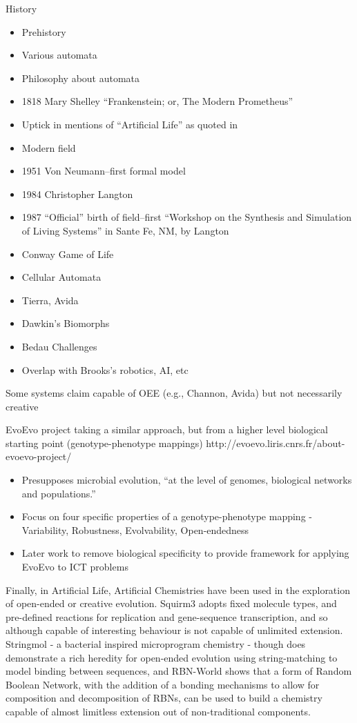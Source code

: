 History

\begin{itemize}
	\item Prehistory
	\item Various automata
	\item
	      Philosophy about automata
	\item
	      1818 Mary Shelley ``Frankenstein; or, The Modern Prometheus''
	\item
	      Uptick in mentions of ``Artificial Life'' as quoted in \autocite{Aguilar2014}
	\item
	      Modern field
	\item
	      1951 Von Neumann--first formal model
	\item
	      1984 Christopher Langton
	\item
	      1987 ``Official'' birth of field--first ``Workshop on the Synthesis
	      and Simulation of Living Systems'' in Sante Fe, NM, by Langton
	\item
	      Conway Game of Life
	\item
	      Cellular Automata
	\item
	      Tierra, Avida
	\item
	      Dawkin's Biomorphs
	\item
	      Bedau Challenges
	\item
	      Overlap with Brooks's robotics, AI, etc
\end{itemize}

Some systems claim capable of OEE (e.g., Channon, Avida) but not necessarily creative

EvoEvo project taking a similar approach, but from a higher level biological starting point (genotype-phenotype mappings)
http://evoevo.liris.cnrs.fr/about-evoevo-project/

\begin{itemize}
	\item Presupposes microbial evolution, ``at the level of genomes, biological networks and populations.''
	\item Focus on four specific properties of a genotype-phenotype mapping - Variability, Robustness, Evolvability, Open-endedness
	\item Later work to remove biological specificity to provide framework for applying EvoEvo to ICT problems
\end{itemize}

Finally, in Artificial Life, Artificial Chemistries have been used in the exploration of open-ended or creative evolution. Squirm3 \parencite{Hutton2002,Hutton2009,Lucht2012} adopts fixed molecule types, and pre-defined reactions for replication and gene-sequence transcription, and so although capable of interesting behaviour is not capable of unlimited extension. Stringmol \parencite{Hickinbotham2011} - a bacterial inspired microprogram chemistry - though does demonstrate a rich heredity for open-ended evolution using string-matching to model binding between sequences, and RBN-World \parencite{Faulconbridge2011} shows that a form of Random Boolean Network, with the addition of a bonding mechanisms to allow for composition and decomposition of RBNs, can be used to build a chemistry capable of almost limitless extension out of non-traditional components.

